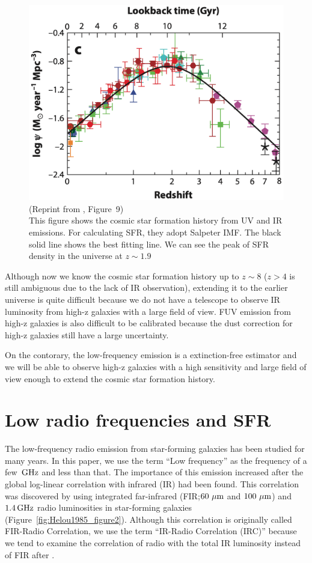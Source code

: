 \begin{figure}[htbp]
	\centering
	\includegraphics[width=.7\linewidth]{Chapter_1/Figures/Madau2014_Figure9.png}
    \caption[Reprint from \citet{Madau2014} (Figure~9)]{\label{fig:Madau2014_figure9}
        (Reprint from \citet{Madau2014}, Figure~9)\\
        This figure shows the cosmic star formation history from UV and IR emissions.
        For calculating SFR, they adopt Salpeter IMF\@.
        The black solid line shows the best fitting line.
        We can see the peak of SFR density in the universe at $z\sim1.9$
    }
\end{figure}

Although now we know the cosmic star formation history up to $z\sim8$ ($z > 4$ is still ambiguous due to the lack of IR observation), extending it to the earlier universe is quite difficult because we do not have a telescope to observe IR luminosity from high-z galaxies with a large field of view.
FUV emission from high-z galaxies is also difficult to be calibrated because the dust correction for high-z galaxies still have a large uncertainty.

On the contorary, the low-frequency emission is a extinction-free estimator and we will be able to observe high-z galaxies with a high sensitivity and large field of view enough to extend the cosmic star formation history.





\section{Low radio frequencies and SFR}\label{sec:lowradiofrequenciesandsfr}

The low-frequency radio emission from star-forming galaxies has been studied for many years.
In this paper, we use the term ``Low frequency'' as the frequency of a few $\,\mathrm{GHz}$ and less than that.
The importance of this emission increased after the global log-linear correlation with infrared (IR) had been found.
This correlation was discovered by \citet{Helou1985} using integrated far-infrared (FIR;\@$60\,\,\mathrm{\mu m}$ and $100\,\,\mathrm{\mu m}$) and $1.4\,\mathrm{GHz}$ radio luminosities in star-forming galaxies (Figure~\ref{fig:Helou1985_figure2}).
Although this correlation is originally called FIR-Radio Correlation, we use the term ``IR-Radio Correlation (IRC)'' because we tend to examine the correlation of radio with the total IR luminosity instead of FIR after \citet{Bell2003}.

